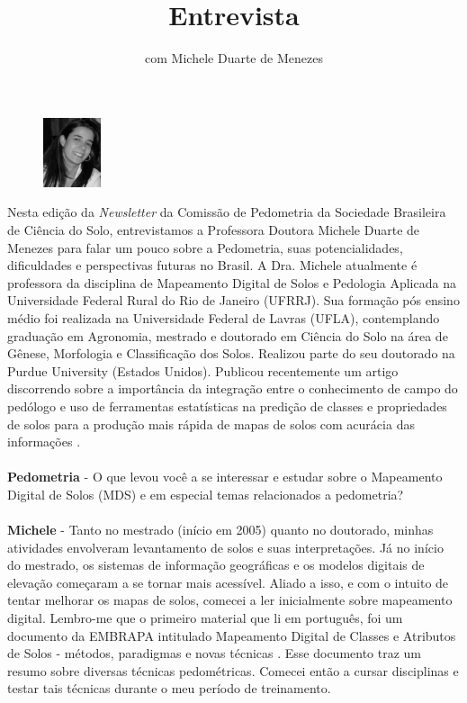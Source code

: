 \title{Entrevista}
\subtitle{com Michele Duarte de Menezes}
\maketitle
\begin{figure}
\includegraphics[width=0.15\textwidth]{figuras/foto-michele.png}
\end{figure}
Nesta edição da \textit{Newsletter} da Comissão de Pedometria da Sociedade Brasileira de Ciência do Solo, entrevistamos a Professora Doutora Michele Duarte de Menezes para falar um pouco sobre a Pedometria, suas potencialidades, dificuldades e perspectivas futuras no Brasil. A Dra. Michele atualmente é professora da disciplina de  Mapeamento Digital de Solos e Pedologia Aplicada na Universidade Federal Rural do Rio de Janeiro (UFRRJ). Sua formação pós ensino médio foi realizada na Universidade Federal de Lavras (UFLA), contemplando graduação em Agronomia, mestrado e doutorado em Ciência do Solo na área de Gênese, Morfologia e Classificação dos Solos. Realizou parte do seu doutorado na Purdue University (Estados Unidos). Publicou recentemente um artigo discorrendo sobre a importância da integração entre o conhecimento de campo do pedólogo e uso de ferramentas  estatísticas na predição de classes e propriedades de solos para a produção mais rápida de mapas de solos com acurácia das informações \citep{MenezesEtAl:2013}.\\
\\
\textbf{Pedometria} - O que levou você a se interessar e estudar sobre o Mapeamento Digital de Solos (MDS) e em especial temas relacionados a pedometria?\\
\\
\textbf{Michele} - Tanto no mestrado (início em 2005) quanto no doutorado, minhas atividades envolveram levantamento de solos e suas interpretações. Já no início do mestrado, os sistemas de informação geográficas e os modelos digitais de elevação começaram a se tornar mais acessível. Aliado a isso, e com o intuito de tentar melhorar os mapas de solos, comecei a ler inicialmente sobre mapeamento digital. Lembro-me que o primeiro material que li em português, foi um documento da EMBRAPA intitulado Mapeamento Digital de Classes e Atributos de Solos - métodos, paradigmas e novas técnicas \citep{MendoncaSantosEtAl:2003}. Esse documento traz um resumo sobre diversas técnicas pedométricas. Comecei então a cursar disciplinas e testar tais técnicas durante o meu período de treinamento.\\
